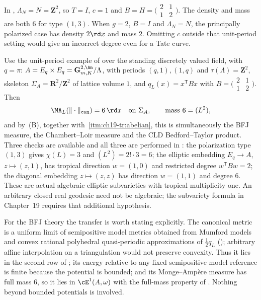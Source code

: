 In , $\Lambda_N=N=\mathbf Z^2$,
so $T=I$, $c=1$ and
$B=H=\bigl(\begin{smallmatrix}2&1\\1&2\end{smallmatrix}\bigr)$.
The density and mass are both $6$ for type $(1,3)$.
When $g=2$, $B=I$ and $\Lambda_N=N$, the principally polarized case has
density $2\rd x$ and mass $2$.  Omitting $c$ outside that unit-period
setting would give an incorrect degree even for a Tate curve.

\begin{example}
\label{ex:ch31-abelian-surface-bfj}
Use the unit-period example of 
over the standing discretely valued field, with $q=\pi$:
$A=E_q\times E_q=\mathbf G_{m,K}^{2,\An}/\Lambda$, with periods
$(q,1),(1,q)$ and
$\tau(\Lambda)=\mathbf Z^2$, skeleton
$\Sigma_A=\mathbf R^2/\mathbf Z^2$ of lattice volume $1$, and
$q_L(x)=x^{\mathsf T}Bx$ with
$B=\bigl(\begin{smallmatrix}2&1\\1&2\end{smallmatrix}\bigr)$.  Then
\[
 \MA_L(\|\cdot\|_{\mathrm{can}})=6\,\rd x
 \quad\text{on }\Sigma_A,
 \qquad\text{mass }6=(L^2),
\]
and by \,(B), together with
\,\cref{itm:ch19-tr:abelian}, this is simultaneously
the BFJ measure, the Chambert--Loir measure and the CLD Bedford--Taylor
product.  Three checks are available and all three are performed in
: the polarization type
$(1,3)$ gives $\chi(L)=3$ and $(L^2)=2!\cdot3=6$; the elliptic embedding $E_q\to A$, $z\mapsto(z,1)$, has tropical
direction $w=(1,0)$ and restricted degree $w^{\mathsf T}Bw=2$;
the diagonal embedding $z\mapsto(z,z)$ has direction $w=(1,1)$ and
degree $6$.  These are actual algebraic elliptic subvarieties with tropical
multiplicity one.  An arbitrary closed real geodesic need not be algebraic;
the subvariety formula in Chapter~19 requires that additional hypothesis.

For the BFJ theory the transfer is worth stating explicitly.  The canonical
metric is a uniform limit of semipositive model metrics obtained from
Mumford models and convex rational polyhedral quasi-periodic approximations
of $\tfrac12q_L$ (\cite{Gub10CM}); arbitrary affine interpolation on a
triangulation would not preserve convexity.  Thus it lies in the second row
of ; its energy relative to any fixed
semipositive model reference is finite because the potential is bounded; and its
Monge--Amp\`ere measure has full mass $6$, so it lies in
$\cE^1(A,\omega)$ with the full-mass property of
.  Nothing beyond bounded potentials is
involved.
\end{example}

